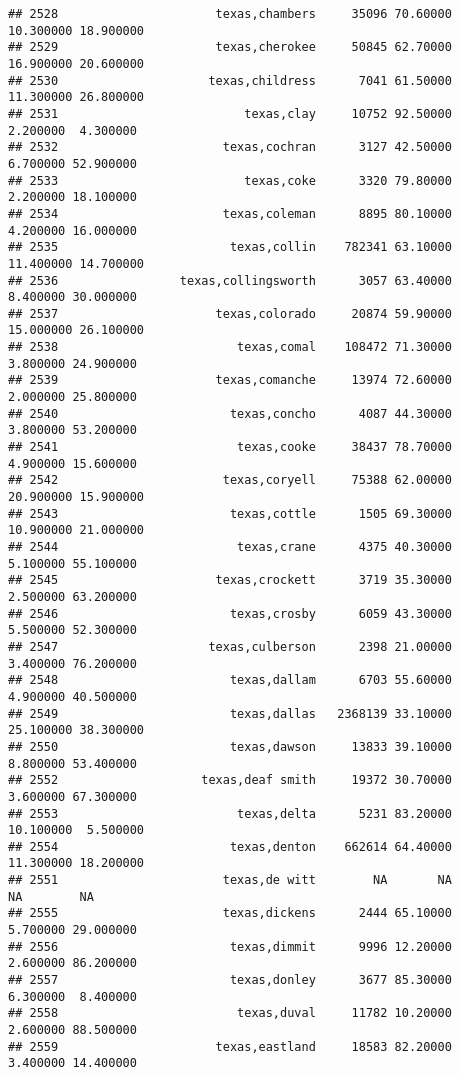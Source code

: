 \documentclass[
]{article}
\begin{document}
\begin{verbatim}
## 2528                      texas,chambers     35096 70.60000 10.300000 18.900000
## 2529                      texas,cherokee     50845 62.70000 16.900000 20.600000
## 2530                     texas,childress      7041 61.50000 11.300000 26.800000
## 2531                          texas,clay     10752 92.50000  2.200000  4.300000
## 2532                       texas,cochran      3127 42.50000  6.700000 52.900000
## 2533                          texas,coke      3320 79.80000  2.200000 18.100000
## 2534                       texas,coleman      8895 80.10000  4.200000 16.000000
## 2535                        texas,collin    782341 63.10000 11.400000 14.700000
## 2536                 texas,collingsworth      3057 63.40000  8.400000 30.000000
## 2537                      texas,colorado     20874 59.90000 15.000000 26.100000
## 2538                         texas,comal    108472 71.30000  3.800000 24.900000
## 2539                      texas,comanche     13974 72.60000  2.000000 25.800000
## 2540                        texas,concho      4087 44.30000  3.800000 53.200000
## 2541                         texas,cooke     38437 78.70000  4.900000 15.600000
## 2542                       texas,coryell     75388 62.00000 20.900000 15.900000
## 2543                        texas,cottle      1505 69.30000 10.900000 21.000000
## 2544                         texas,crane      4375 40.30000  5.100000 55.100000
## 2545                      texas,crockett      3719 35.30000  2.500000 63.200000
## 2546                        texas,crosby      6059 43.30000  5.500000 52.300000
## 2547                     texas,culberson      2398 21.00000  3.400000 76.200000
## 2548                        texas,dallam      6703 55.60000  4.900000 40.500000
## 2549                        texas,dallas   2368139 33.10000 25.100000 38.300000
## 2550                        texas,dawson     13833 39.10000  8.800000 53.400000
## 2552                    texas,deaf smith     19372 30.70000  3.600000 67.300000
## 2553                         texas,delta      5231 83.20000 10.100000  5.500000
## 2554                        texas,denton    662614 64.40000 11.300000 18.200000
## 2551                       texas,de witt        NA       NA        NA        NA
## 2555                       texas,dickens      2444 65.10000  5.700000 29.000000
## 2556                        texas,dimmit      9996 12.20000  2.600000 86.200000
## 2557                        texas,donley      3677 85.30000  6.300000  8.400000
## 2558                         texas,duval     11782 10.20000  2.600000 88.500000
## 2559                      texas,eastland     18583 82.20000  3.400000 14.400000

\end{verbatim}
\end{document}
